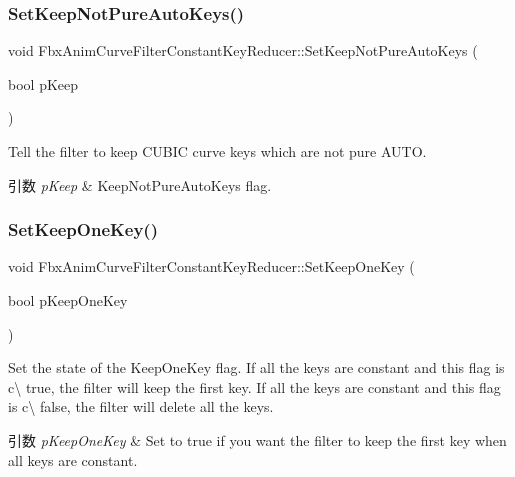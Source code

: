 \subsubsection{\texorpdfstring{Set\+Keep\+Not\+Pure\+Auto\+Keys()}{SetKeepNotPureAutoKeys()}}
{\footnotesize\ttfamily void Fbx\+Anim\+Curve\+Filter\+Constant\+Key\+Reducer\+::\+Set\+Keep\+Not\+Pure\+Auto\+Keys (\begin{DoxyParamCaption}\item[{bool}]{p\+Keep }\end{DoxyParamCaption})}

Tell the filter to keep C\+U\+B\+IC curve keys which are not pure A\+U\+TO. 
\begin{DoxyParams}{引数}
{\em p\+Keep} & Keep\+Not\+Pure\+Auto\+Keys flag. \\
\hline
\end{DoxyParams}
\mbox{\label{class_fbx_anim_curve_filter_constant_key_reducer_ad71523fadea43a9532d600040b37a865}} 
\subsubsection{\texorpdfstring{Set\+Keep\+One\+Key()}{SetKeepOneKey()}}
{\footnotesize\ttfamily void Fbx\+Anim\+Curve\+Filter\+Constant\+Key\+Reducer\+::\+Set\+Keep\+One\+Key (\begin{DoxyParamCaption}\item[{bool}]{p\+Keep\+One\+Key }\end{DoxyParamCaption})}

Set the state of the Keep\+One\+Key flag. If all the keys are constant and this flag is c\textbackslash{} true, the filter will keep the first key. If all the keys are constant and this flag is c\textbackslash{} false, the filter will delete all the keys. 
\begin{DoxyParams}{引数}
{\em p\+Keep\+One\+Key} & Set to {\ttfamily true} if you want the filter to keep the first key when all keys are constant. \\
\hline
\end{DoxyParams}
\mbox{\label{class_fbx_anim_curve_filter_constant_key_reducer_aa0d5c478c267b58cd0de9cedb9f931dd}} 
